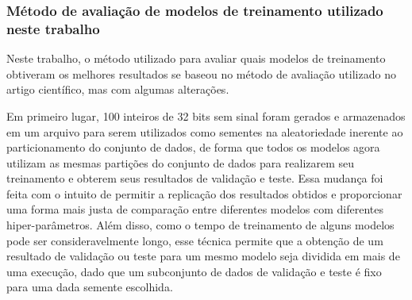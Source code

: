 \subsubsection{Método de avaliação de modelos de treinamento utilizado neste trabalho}

Neste trabalho, o método utilizado para avaliar quais modelos de treinamento obtiveram os melhores resultados se baseou no método de avaliação utilizado no artigo científico\cite{chicco2020}, mas com algumas alterações.

Em primeiro lugar, 100 inteiros de 32 bits sem sinal foram gerados e armazenados em um arquivo para serem utilizados como sementes na aleatoriedade inerente ao particionamento do conjunto de dados\cite{larxel_dataset}, de forma que todos os modelos agora utilizam as mesmas partições do conjunto de dados para realizarem seu treinamento e obterem seus resultados de validação e teste. Essa mudança foi feita com o intuito de permitir a replicação dos resultados obtidos e proporcionar uma forma mais justa de comparação entre diferentes modelos com diferentes hiper-parâmetros. Além disso, como o tempo de treinamento de alguns modelos pode ser consideravelmente longo, esse técnica permite que a obtenção de um resultado de validação ou teste para um mesmo modelo seja dividida em mais de uma execução, dado que um subconjunto de dados de validação e teste é fixo para uma dada semente escolhida.

